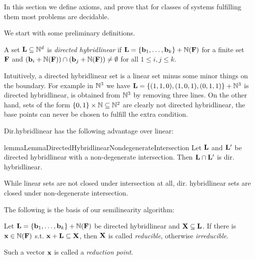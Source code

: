 
In this section we define axioms, and prove that for classes of systems fulfilling them most problems are decidable.

We start with some preliminary definitions.

\begin{definition}
A set \(\mathbf{L} \subseteq \mathbb{N}^d\) is \emph{directed hybridlinear} if \(\mathbf{L}=\{\mathbf{b}_1, \dots, \mathbf{b}_k\}+\mathbb{N}(\mathbf{F})\) for a finite set \(\mathbf{F}\) and \((\mathbf{b}_i+\mathbb{N}(\mathbf{F})) \cap (\mathbf{b}_j+\mathbb{N}(\mathbf{F})) \neq \emptyset\) for all \(1 \leq i,j \leq k\).
\end{definition}

Intuitively, a directed hybridlinear set is a linear set minus some minor things on the boundary. For example in \(\mathbb{N}^3\) we have \(\mathbf{L}=\{(1,1,0), (1,0,1), (0,1,1)\}+\mathbb{N}^3\) is directed hybridlinear, is obtained from \(\mathbb{N}^3\) by removing three lines. On the other hand, sets of the form \(\{0,1\} \times \mathbb{N} \subseteq \mathbb{N}^2\) are clearly not directed hybridlinear, the base points can never be chosen to fulfill the extra condition.

Dir.hybridlinear has the following advantage over linear:

\begin{restatable}{lemma}{LemmaDirectedHybridlinearNondegenerateIntersection}
Let \(\mathbf{L}\) and \(\mathbf{L}'\) be directed hybridlinear with a non-degenerate intersection. Then \(\mathbf{L} \cap \mathbf{L}'\) is dir. hybridlinear. \label{LemmaDirectedHybridlinearNondegenerateIntersection}
\end{restatable}

While linear sets are not closed under intersection at all, dir. hybridlinear sets are closed under non-degenerate intersection.

The following is the basis of our semilinearity algorithm:

\begin{definition}
Let \(\mathbf{L}=\{\mathbf{b}_1, \dots, \mathbf{b}_k\}+\mathbb{N}(\mathbf{F})\) be directed hybridlinear and \(\mathbf{X} \subseteq \mathbf{L}\). If there is \(\mathbf{x} \in \mathbb{N}(\mathbf{F})\) s.t. \(\mathbf{x}+\mathbf{L} \subseteq \mathbf{X}\), then \(\mathbf{X}\) is called \emph{reducible}, otherwise \emph{irreducible}. 

Such a vector \(\mathbf{x}\) is called a \emph{reduction point}.
\end{definition}


